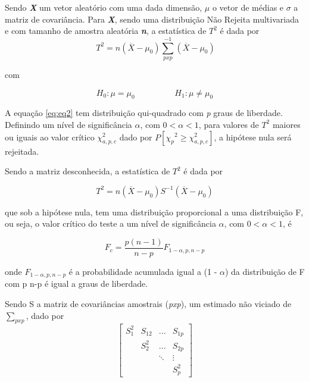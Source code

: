 Sendo \textbf{\textit{X}} um vetor aleatório com uma dada dimensão, \textbf{\textit{$\mu$}} o vetor de médias e \textbf{\textit{$\sigma$}} a matriz de covariância. Para \textbf{\textit{X}}, sendo uma distribuição Não Rejeita multivariada e com tamanho de amostra aleatória \textbf{\textit{n}}, a estatística de $T^2$ é dada por
\begin{equation}
\ T^2 = n(\overline{X} - \mu_0) \sum_{pxp}^{-1} {(\overline{X} - \mu_0)}
\label{eq:eq2}
\end{equation}

com

\begin{equation}
 H_0 : \mu = \mu_0 \hspace{2cm} H_1 : \mu \neq \mu_0
\label{eq:eq3}
\end{equation}

A equação \ref{eq:eq2} tem distribuição qui-quadrado com \textit{p} graus de liberdade. Definindo um nível de significância $\alpha$, com $0 < \alpha < 1$, para valores de $T^2$  maiores ou iguais ao valor crítico ${\chi^2_{a,p,c}}$ dado por $P[{\chi_p}^2 \geq {\chi^2_{a,p,c}}]$,  a hipótese nula será rejeitada.   

Sendo a matriz desconhecida, a estatística de $T^2$ é dada por

\begin{equation}
T^2 = n(\overline{X} -\mu_0) S^{-1}(\overline{X} - \mu_0)
\label{eq:eq4}
\end{equation}

que sob a hipótese nula, tem uma distribuição proporcional a uma distribuição F, ou seja, o valor crítico do teste a um nível de significância $\alpha$, com $0 < \alpha < 1$, é

\begin{equation}
F_c = \frac{p(n-1)}{n-p} F_{1-\alpha, p, n - p}
\label{eq:eq5}
\end{equation}

onde $F_{1-\alpha, p, n - p}$ é a probabilidade acumulada igual a (1 - $\alpha$) da distribuição de F com p
n-p é igual a graus de liberdade.

Sendo S a matriz de covariâncias amostrais (\textit{pxp}), um estimado não viciado de $\sum_{pxp}$, dado por
\begin{equation}
\begin{bmatrix}
S^{2}_{1} & S_{12} & ... & S_{1p} \\ 
 & S^{2}_{2} & ... & S_{2p} \\ 
 &  & \ddots  & \vdots  \\ 
 &  &  & S^{2}_{p}
\end{bmatrix}
 \label{eq:eq6}
\end{equation}


